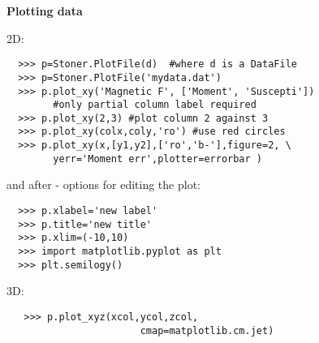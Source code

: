 \documentclass[a4paper,9pt,threecolumn,landscape]{scrartcl}
\begin{document}
\begin{multicols}{3}
\vspace{0.2cm}
\textbf {Plotting data}
\vspace{0.2cm}\normalfont

2D:
\begin{verbatim}
  >>> p=Stoner.PlotFile(d)  #where d is a DataFile
  >>> p=Stoner.PlotFile('mydata.dat')
  >>> p.plot_xy('Magnetic F', ['Moment', 'Suscepti'])
  		#only partial column label required
  >>> p.plot_xy(2,3) #plot column 2 against 3
  >>> p.plot_xy(colx,coly,'ro') #use red circles
  >>> p.plot_xy(x,[y1,y2],['ro','b-'],figure=2, \
        yerr='Moment err',plotter=errorbar )
\end{verbatim}
and after - options for editing the plot:
\begin{verbatim}
  >>> p.xlabel='new label'
  >>> p.title='new title'
  >>> p.xlim=(-10,10)
  >>> import matplotlib.pyplot as plt
  >>> plt.semilogy()
\end{verbatim}
3D:
\begin{verbatim}
   >>> p.plot_xyz(xcol,ycol,zcol,
                       cmap=matplotlib.cm.jet)
\end{verbatim}
\end{multicols}
\newpage
\end{document}
